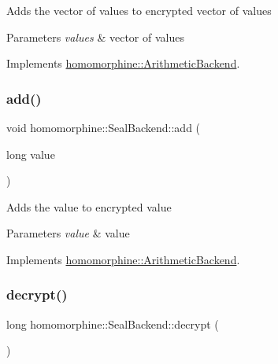 Adds the vector of values to encrypted vector of values


\begin{DoxyParams}{Parameters}
{\em values} & vector of values \\
\hline
\end{DoxyParams}


Implements \mbox{\hyperlink{classhomomorphine_1_1_arithmetic_backend_abf4053e05f07e566e9563a75f516daf6}{homomorphine\+::\+Arithmetic\+Backend}}.

\mbox{\label{classhomomorphine_1_1_seal_backend_acbff51d94165f4e578cafaeb965e4367}} 
\subsubsection{\texorpdfstring{add()}{add()}\hspace{0.1cm}{\footnotesize\ttfamily [2/2]}}
{\footnotesize\ttfamily void homomorphine\+::\+Seal\+Backend\+::add (\begin{DoxyParamCaption}\item[{long}]{value }\end{DoxyParamCaption})\hspace{0.3cm}{\ttfamily [virtual]}}

Adds the value to encrypted value


\begin{DoxyParams}{Parameters}
{\em value} & value \\
\hline
\end{DoxyParams}


Implements \mbox{\hyperlink{classhomomorphine_1_1_arithmetic_backend_aa1c88ebc894527a72a9fdbd35ca14204}{homomorphine\+::\+Arithmetic\+Backend}}.

\mbox{\label{classhomomorphine_1_1_seal_backend_a0496053defd79b8bd42d4d9c6b4b4ccc}} 
\subsubsection{\texorpdfstring{decrypt()}{decrypt()}}
{\footnotesize\ttfamily long homomorphine\+::\+Seal\+Backend\+::decrypt (\begin{DoxyParamCaption}{ }\end{DoxyParamCaption})\hspace{0.3cm}{\ttfamily [virtual]}}

